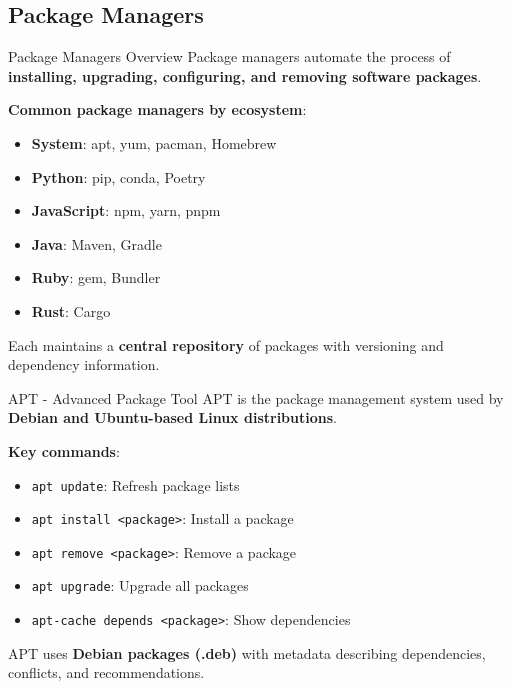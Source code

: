 \documentclass{beamer}
\begin{document}
\subsection{Package Managers}

\begin{frame}[t]{Package Managers Overview}
Package managers automate the process of \textbf{installing, upgrading, configuring, and removing software packages}.

\bigskip

\textbf{Common package managers by ecosystem}:
\begin{itemize}
\item \textbf{System}: apt, yum, pacman, Homebrew
\item \textbf{Python}: pip, conda, Poetry
\item \textbf{JavaScript}: npm, yarn, pnpm
\item \textbf{Java}: Maven, Gradle
\item \textbf{Ruby}: gem, Bundler
\item \textbf{Rust}: Cargo
\end{itemize}

\bigskip

Each maintains a \textbf{central repository} of packages with versioning and dependency information.
\end{frame}

\begin{frame}[t]{APT - Advanced Package Tool}
APT is the package management system used by \textbf{Debian and Ubuntu-based Linux distributions}.

\bigskip

\textbf{Key commands}:
\begin{itemize}
\item \texttt{apt update}: Refresh package lists
\item \texttt{apt install <package>}: Install a package
\item \texttt{apt remove <package>}: Remove a package
\item \texttt{apt upgrade}: Upgrade all packages
\item \texttt{apt-cache depends <package>}: Show dependencies
\end{itemize}

\bigskip

APT uses \textbf{Debian packages (.deb)} with metadata describing dependencies, conflicts, and recommendations.
\end{frame}
\end{document}
